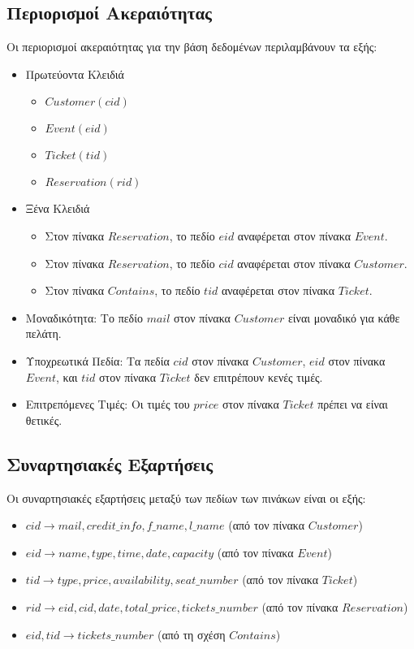 \documentclass{article}
\begin{document}
\subsection*{Περιορισμοί Ακεραιότητας}
Οι περιορισμοί ακεραιότητας για την βάση δεδομένων περιλαμβάνουν τα εξής:
\begin{itemize}
    \item Πρωτεύοντα Κλειδιά
    \begin{itemize}
        \item $Customer(cid)$
        \item $Event(eid)$
        \item $Ticket(tid)$
        \item $Reservation(rid)$
    \end{itemize}
    \item Ξένα Κλειδιά
    \begin{itemize}
        \item Στον πίνακα $Reservation$, το πεδίο $eid$ αναφέρεται στον πίνακα $Event$.
        \item Στον πίνακα $Reservation$, το πεδίο $cid$ αναφέρεται στον πίνακα $Customer$.
        \item Στον πίνακα $Contains$, το πεδίο $tid$ αναφέρεται στον πίνακα $Ticket$.
    \end{itemize}
    \item Μοναδικότητα: Το πεδίο $mail$ στον πίνακα $Customer$ είναι μοναδικό για κάθε πελάτη.
    \item Υποχρεωτικά Πεδία: Τα πεδία $cid$ στον πίνακα $Customer$, $eid$ στον πίνακα $Event$, και $tid$ στον πίνακα $Ticket$ δεν επιτρέπουν κενές τιμές.
    \item Επιτρεπόμενες Τιμές: Οι τιμές του $price$ στον πίνακα $Ticket$ πρέπει να είναι θετικές.
\end{itemize}

\subsection*{Συναρτησιακές Εξαρτήσεις}
Οι συναρτησιακές εξαρτήσεις μεταξύ των πεδίων των πινάκων είναι οι εξής:
\begin{itemize}
    \item $cid \rightarrow mail, credit\_info, f\_name, l\_name$ (από τον πίνακα $Customer$)
    \item $eid \rightarrow name, type, time, date, capacity$ (από τον πίνακα $Event$)
    \item $tid \rightarrow type, price, availability, seat\_number$ (από τον πίνακα $Ticket$)
    \item $rid \rightarrow eid, cid, date, total\_price, tickets\_number$ (από τον πίνακα $Reservation$)
    \item $eid, tid \rightarrow tickets\_number$ (από τη σχέση $Contains$)
\end{itemize}
\end{document}
